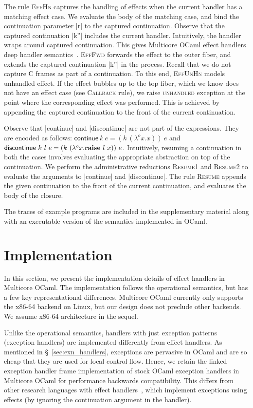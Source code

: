 \documentclass[sigplan,10pt,review,anonymous]{acmart}\settopmatter{printfolios=true,printccs=false,printacmref=false}
\newcommand{\olam}[2]{\lambda^o #1. #2}
\newcommand{\kw}[1]{\text{\bf #1}}
\newcommand{\throw}[2]{\kw{raise} ~#1 ~#2}
\begin{document}
The rule \textsc{EffHn} captures the handling of effects when the current
handler has a matching effect case. We evaluate the body of the matching case,
and bind the continuation parameter |r| to the captured continuation. Observe
that the captured continuation |k''| includes the current handler. Intuitively,
the handler wraps around captured continuation. This gives Multicore OCaml
effect handlers deep handler semantics~\cite{}. \textsc{EffFwd} forwards the
effect to the outer fiber, and extends the captured continuation |k''| in the
process. Recall that we do not capture C frames as part of a continuation. To
this end, \textsc{EffUnHn} models unhandled effect. If the effect bubbles up to
the top fiber, which we know does not have an effect case (see
\textsc{Callback} rule), we raise \textsc{unhandled} exception at the point
where the corresponding effect was performed. This is achieved by appending the
captured continuation to the front of the current continuation.

Observe that |continue| and |discontinue| are not part of the expressions. They
are encoded as follows: $\textsf{continue} ~k ~e = (k ~(\olam{x}{x})) ~e$ and
$\textsf{discontinue} ~k ~l ~e = (k ~(\olam{x}{\throw{l}{x}})) ~e$.
Intuitively, resuming a continuation in both the cases involves evaluating the
appropriate abstraction on top of the continuation. We perform the
administrative reductions \textsc{Resume1} and \textsc{Resume2} to evaluate the
arguments to |continue| and |discontinue|. The rule \textsc{Resume} appends the
given continuation to the front of the current continuation, and evaluates the
body of the closure.

The traces of example programs are included in the supplementary material along
with an executable version of the semantics implemented in OCaml.

\section{Implementation}
\label{sec:impl}

In this section, we present the implementation details of effect handlers in
Multicore OCaml. The implementation follows the operational semantics, but has
a few key representational differences. Multicore OCaml currently only supports
the x86-64 backend on Linux, but our design does not preclude other backends.
We assume x86-64 architecture in the sequel.

Unlike the operational semantics, handlers with just exception patterns
(exception handlers) are implemented differently from effect handlers. As
mentioned in \S~\ref{sec:exn_handlers}, exceptions are pervasive in OCaml and
are so cheap that they are used for local control flow. Hence, we retain the
linked exception handler frame implementation of stock OCaml exception handlers
in Multicore OCaml for performance backwards compatibility. This differs from
other research languages with effect handlers~\cite{Links,Frank,Eff}, which
implement exceptions using effects (by ignoring the continuation argument in
the handler).
\end{document}
